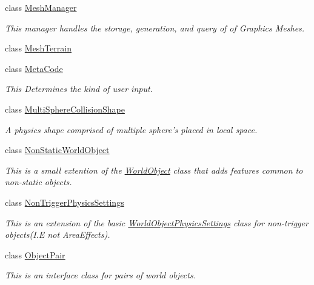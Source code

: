 \begin{DoxyCompactItemize}
class \hyperlink{classMezzanine_1_1MeshManager}{MeshManager}
\begin{DoxyCompactList}\small\item\em This manager handles the storage, generation, and query of of Graphics Meshes. \item\end{DoxyCompactList}\item 
class \hyperlink{classMezzanine_1_1MeshTerrain}{MeshTerrain}
\item 
class \hyperlink{classMezzanine_1_1MetaCode}{MetaCode}
\begin{DoxyCompactList}\small\item\em This Determines the kind of user input. \item\end{DoxyCompactList}\item 
class \hyperlink{classMezzanine_1_1MultiSphereCollisionShape}{MultiSphereCollisionShape}
\begin{DoxyCompactList}\small\item\em A physics shape comprised of multiple sphere's placed in local space. \item\end{DoxyCompactList}\item 
class \hyperlink{classMezzanine_1_1NonStaticWorldObject}{NonStaticWorldObject}
\begin{DoxyCompactList}\small\item\em This is a small extention of the \hyperlink{classMezzanine_1_1WorldObject}{WorldObject} class that adds features common to non-\/static objects. \item\end{DoxyCompactList}\item 
class \hyperlink{classMezzanine_1_1NonTriggerPhysicsSettings}{NonTriggerPhysicsSettings}
\begin{DoxyCompactList}\small\item\em This is an extension of the basic \hyperlink{classMezzanine_1_1WorldObjectPhysicsSettings}{WorldObjectPhysicsSettings} class for non-\/trigger objects(I.E not AreaEffects). \item\end{DoxyCompactList}\item 
class \hyperlink{classMezzanine_1_1ObjectPair}{ObjectPair}
\begin{DoxyCompactList}\small\item\em This is an interface class for pairs of world objects. \item\end{DoxyCompactList}\item 

\end{DoxyCompactItemize}
